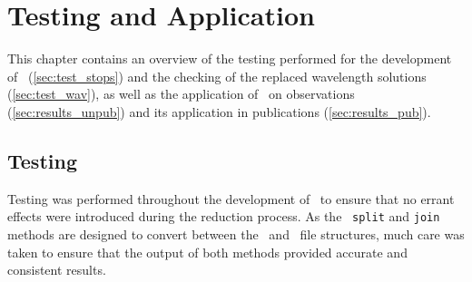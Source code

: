 \chapter{Testing and Application}

This chapter contains an overview of the testing performed for the development of \stops\ (\autoref{sec:test_stops}) and the checking of the replaced wavelength solutions (\autoref{sec:test_wav}), as well as the application of \stops\ on observations (\autoref{sec:results_unpub}) and its application in publications (\autoref{sec:results_pub}).

\section[Testing \textsc{stops}]{Testing \stops} \label{sec:test_stops}

Testing was performed throughout the development of \stops\ to ensure that no errant effects were introduced during the reduction process. As the \stops\ \texttt{split} and \texttt{join} methods are designed to convert between the \polsalt\ and \iraf\ file structures, much care was taken to ensure that the output of both methods provided accurate and consistent results.


